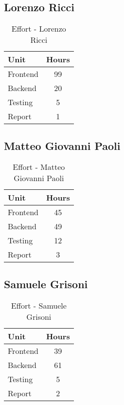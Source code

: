 \subsection*{Lorenzo Ricci}
\begin{table}[H]
    \centering
\begin{tabular}{|p{4.5cm}|c|}
        \hline
        \textbf{Unit} & \textbf{Hours} \\ \hline
        Frontend & 99 \\ \hline
        Backend & 20 \\ \hline
        Testing & 5 \\ \hline
        Report & 1 \\ \hline
    \end{tabular}
    \caption{Effort - Lorenzo Ricci}
    \label{tab:effort-ricci}
\end{table}
\subsection*{Matteo Giovanni Paoli}
\begin{table}[H]
    \centering
    \begin{tabular}{|p{4.5cm}|c|}
        \hline
        \textbf{Unit} & \textbf{Hours} \\ \hline
        Frontend & 45 \\ \hline
        Backend & 49 \\ \hline
        Testing & 12 \\ \hline
        Report & 3 \\ \hline
    \end{tabular}
    \caption{Effort - Matteo Giovanni Paoli}
    \label{tab:effort-paoli}
\end{table}

\subsection*{Samuele Grisoni}
\begin{table}[H]
    \centering
\begin{tabular}{|p{4.5cm}|c|}
        \hline
        \textbf{Unit} & \textbf{Hours} \\ \hline
        Frontend & 39 \\ \hline
        Backend & 61 \\ \hline
        Testing & 5 \\ \hline
        Report & 2\\ \hline
    \end{tabular}
    \caption{Effort - Samuele Grisoni}
    \label{tab:effort-grisoni}
\end{table}

